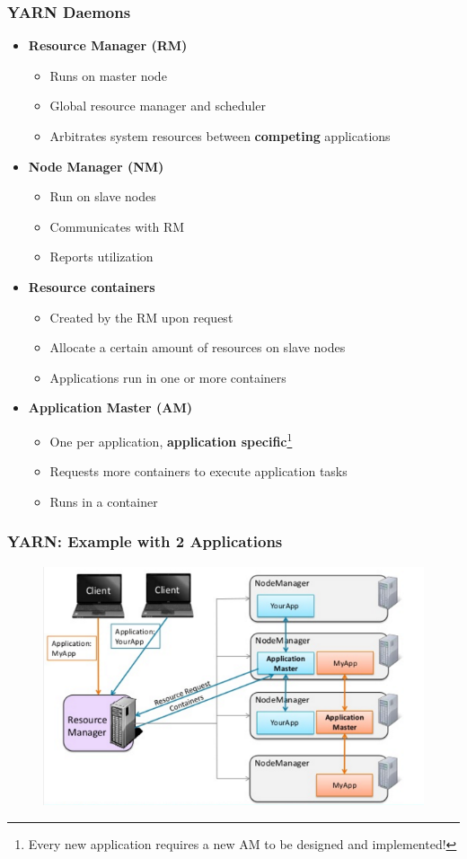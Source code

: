 \begin{frame}
\frametitle{YARN Daemons}
\begin{itemize}
  \item {\bf Resource Manager (RM)}
  \begin{itemize}
    \item Runs on master node
    \item Global resource manager and scheduler
    \item Arbitrates system resources between {\bf competing} applications
  \end{itemize}
  \item {\bf Node Manager (NM)}
  \begin{itemize}
    \item Run on slave nodes
    \item Communicates with RM
    \item Reports utilization
  \end{itemize}
  \item {\bf Resource containers}
  \begin{itemize}
    \item Created by the RM upon request
    \item Allocate a certain amount of resources on slave nodes
    \item Applications run in one or more containers
  \end{itemize}
  \item {\bf Application Master (AM)}
  \begin{itemize}
    \item One per application, {\bf application specific}\footnote{Every new application requires a new AM to be designed and implemented!}
    \item Requests more containers to execute application tasks
    \item Runs in a container
  \end{itemize}
\end{itemize}
\end{frame}

\begin{frame}
\frametitle{YARN: Example with 2 Applications}
\begin{figure}[h]
  \centering
  \includegraphics[scale=0.4]{./figures/yarn_ex1}
  \label{fig:yarn_ex1}
\end{figure}
\end{frame}

